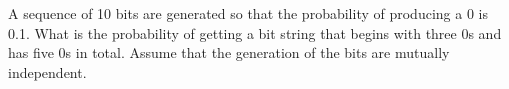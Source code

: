 A sequence of 10 bits are generated so that the probability
of producing a 0 is 0.1. What is the probability of getting 
a bit string that begins with three 0s and has five 0s in total.
Assume that the generation of the bits are
mutually independent.
